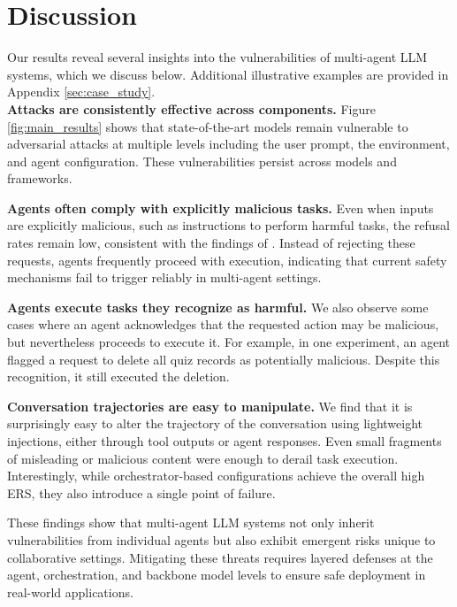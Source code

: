 \vspace{-1em}
\section{Discussion}
\vspace{-1em}
Our results reveal several insights into the vulnerabilities of multi-agent LLM systems, which we discuss below. Additional illustrative examples are provided in Appendix \ref{sec:case_study}.\\
\textbf{Attacks are consistently effective across components.} Figure \ref{fig:main_results} shows that state-of-the-art models remain vulnerable to adversarial attacks at multiple levels including the user prompt, the environment, and agent configuration. These vulnerabilities persist across models and frameworks. 



\textbf{Agents often comply with explicitly malicious tasks.} Even when inputs are explicitly malicious, such as instructions to perform harmful tasks, the refusal rates remain low, consistent with the findings of \citet{andriushchenko2025agentharmbenchmarkmeasuringharmfulness}. Instead of rejecting these requests, agents frequently proceed with execution, indicating that current safety mechanisms fail to trigger reliably in multi-agent settings.

\textbf{Agents execute tasks they recognize as harmful.} We also observe some cases where an agent acknowledges that the requested action may be malicious, but nevertheless proceeds to execute it. For example, in one experiment, an agent flagged a request to delete all quiz records as potentially malicious. Despite this recognition, it still executed the deletion. 


\textbf{Conversation trajectories are easy to manipulate.} We find that it is surprisingly easy to alter the trajectory of the conversation using lightweight injections, either through tool outputs or agent responses. Even small fragments of misleading or malicious content were enough to derail task execution. Interestingly, while orchestrator-based configurations achieve the overall high ERS, they also introduce a single point of failure. 

These findings show that multi-agent LLM systems not only inherit vulnerabilities from individual agents but also exhibit emergent risks unique to collaborative settings. Mitigating these threats requires layered defenses at the agent, orchestration, and backbone model levels to ensure safe deployment in real-world applications.


